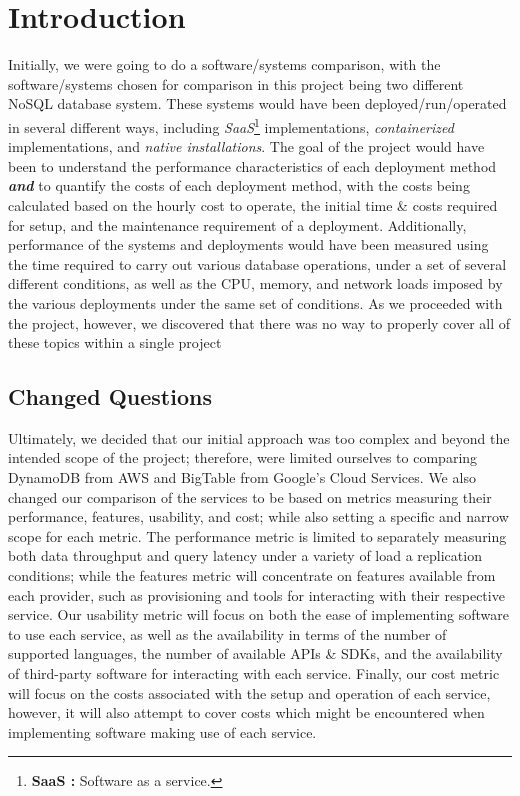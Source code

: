 \section{Introduction}

Initially, we were going to do a software/systems comparison, with the software/systems chosen for comparison in this project being two different NoSQL database system.  These systems would have been deployed/run/operated in several different ways, including \emph{SaaS}\footnote{\textbf{SaaS :} Software as a service.} implementations, \emph{containerized} implementations, and \emph{native installations}.  The goal of the project would have been to understand the performance characteristics of each deployment method \emph{\textbf{and}} to quantify the costs of each deployment method, with the costs being calculated based on the hourly cost to operate, the initial time \& costs required for setup, and the maintenance requirement of a deployment.  Additionally, performance of the systems and deployments would have been measured using the time required to carry out various database operations, under a set of several different conditions, as well as the CPU, memory, and network loads imposed by the various deployments under the same set of conditions. As we proceeded with the project, however, we discovered that there was no way to properly cover all of these topics within a single project 



\subsection{Changed Questions}

Ultimately, we decided that our initial approach was too complex and beyond the intended scope of the project; therefore, were limited ourselves to comparing DynamoDB from AWS and BigTable from Google's Cloud Services.  We also changed our comparison of the services to be based on metrics measuring their performance, features, usability, and cost; while also setting a specific and narrow scope for each metric.  The performance metric is limited to separately measuring both data throughput and query latency under a variety of load a replication conditions; while the features metric will concentrate on features available from each provider, such as provisioning and tools for interacting with their respective service.  Our usability metric will focus on both the ease of implementing software to use each service, as well as the availability in terms of the number of supported languages, the number of available APIs \& SDKs, and the availability of third-party software for interacting with each service.  Finally, our cost metric will focus on the costs associated with the setup and operation of each service, however, it will also attempt to cover costs which might be encountered when implementing software making use of each service.


